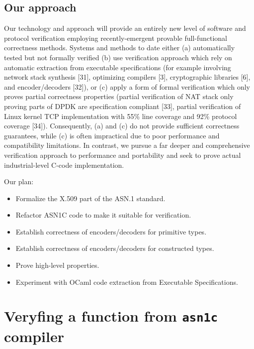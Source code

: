 \documentclass{article}
\begin{document}
\subsection{Our approach}
  Our technology and approach will provide an entirely new level of software and protocol verification employing recently-emergent provable full-functional correctness methods.
  Systems and methods to date either (a) automatically tested but not formally verified (b) use verification approach which rely on automatic extraction from executable specifications (for example involving network stack synthesis [31], optimizing compilers [3], cryptographic libraries [6], and encoder/decoders [32]), or (c) apply a form of formal verification which only proves partial correctness properties (partial verification of NAT stack only proving parts of DPDK are specification compliant [33], partial verification of Linux kernel TCP implementation with 55\% line coverage and 92\% protocol coverage [34]). Consequently, (a) and (c) do not provide sufficient correctness guarantees, while (c) is often impractical due to poor performance and compatibility limitations. In contrast, we pursue a far deeper and comprehensive verification approach to performance and portability and seek to prove actual industrial-level C-code implementation.

  Our plan:
  \begin{itemize}

  \item Formalize the X.509 part of the ASN.1 standard.  
   
  \item Refactor ASN1C code to make it suitable for verification.

   \item Establish correctness of encoders/decoders for primitive types.

  \item Establish correctness of encoders/decoders for constructed types.

  \item Prove high-level properties.

   \item Experiment with OCaml code extraction from Executable Specifications.
  \end{itemize}

\section{Veryfing a function from \texttt{asn1c} compiler}
\end{document}
